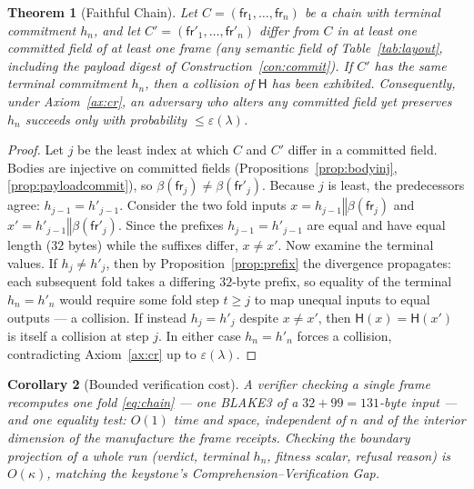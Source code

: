 \documentclass[11pt,oneside]{book}
\theoremstyle{definition}
\theoremstyle{plain}
\newtheorem{theorem}{Theorem}[chapter]
\newtheorem{corollary}[theorem]{Corollary}
\theoremstyle{remark}
\newcommand{\chainH}{\mathsf{H}}               %
\newcommand{\CL}{\kappa}                       %
\newcommand{\fr}{\mathsf{fr}}                   %
\newcommand{\body}{\beta}                       %
\newcommand{\concat}{\mathbin{\Vert}}           %
\newcommand{\Ledger}{C}               %
\begin{document}
\begin{theorem}[Faithful Chain]\label{thm:faithful}
Let $\Ledger=(\fr_1,\dots,\fr_n)$ be a chain with terminal commitment $h_n$, and let $\Ledger'=(\fr'_1,\dots,\fr'_n)$ differ from $\Ledger$ in at least one committed field of at least one frame (any semantic field of Table~\ref{tab:layout}, including the payload digest of Construction~\ref{con:commit}). %
If $\Ledger'$ has the \emph{same} terminal commitment $h_n$, then a collision of $\chainH$ has been exhibited. %
Consequently, under Axiom~\ref{ax:cr}, an adversary who alters any committed field yet preserves $h_n$ succeeds only with probability $\le \varepsilon(\lambda)$. %
\end{theorem}

\begin{proof}
Let $j$ be the least index at which $\Ledger$ and $\Ledger'$ differ in a committed field. %
Bodies are injective on committed fields (Propositions~\ref{prop:bodyinj}, \ref{prop:payloadcommit}), so $\body(\fr_j)\ne\body(\fr'_j)$. %
Because $j$ is least, the predecessors agree: $h_{j-1}=h'_{j-1}$. %
Consider the two fold inputs $x=h_{j-1}\concat\body(\fr_j)$ and $x'=h'_{j-1}\concat\body(\fr'_j)$. %
Since the prefixes $h_{j-1}=h'_{j-1}$ are equal and have equal length ($32$ bytes) while the suffixes differ, $x\ne x'$. %
Now examine the terminal values. %
If $h_j\ne h'_j$, then by Proposition~\ref{prop:prefix} the divergence propagates: each subsequent fold takes a differing $32$-byte prefix, so equality of the terminal $h_n=h'_n$ would require some fold step $t\ge j$ to map unequal inputs to equal outputs --- a collision. %
If instead $h_j=h'_j$ despite $x\ne x'$, then $\chainH(x)=\chainH(x')$ is itself a collision at step $j$. %
In either case $h_n=h'_n$ forces a collision, contradicting Axiom~\ref{ax:cr} up to $\varepsilon(\lambda)$. %
\end{proof}

\begin{corollary}[Bounded verification cost]\label{cor:cost}
A verifier checking a single frame recomputes one fold \eqref{eq:chain} --- one BLAKE3 of a $32+99=131$-byte input --- and one equality test: $O(1)$ time and space, independent of $n$ and of the interior dimension of the manufacture the frame receipts. %
Checking the boundary projection of a whole run (verdict, terminal $h_n$, fitness scalar, refusal reason) is $O(\CL)$, matching the keystone's Comprehension--Verification Gap. %
\end{corollary}
\end{document}
